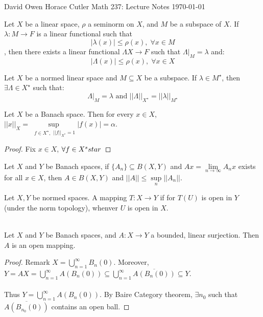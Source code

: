 \documentclass[12pt]{article}
\newenvironment{theorem}[2][Theorem]{\begin{trivlist}
\item[\hskip \labelsep {\bfseries #1}\hskip \labelsep {\bfseries #2.}]}{\end{trivlist}}
\newenvironment{definition}[2][Definition]{\begin{trivlist}
\item[\hskip \labelsep {\bfseries #1}\hskip \labelsep {\bfseries #2.}]}{\end{trivlist}}
\begin{document}
\noindent David Owen Horace Cutler \hfill {\Large Math 237: Lecture Notes} \hfill \today

\begin{theorem}{(Hahn-Banach)}
    Let $X$ be a linear space, $\rho$ a seminorm on $X$, and $M$ be a subspace of $X$. If $\lambda : M \rightarrow F$ is a linear functional such that $$|\lambda(x)| \leq \rho(x), \; \forall x \in M$$
    , then there exists a linear functional $\Lambda X \rightarrow F$ such that $\Lambda \vert_M = \lambda$ and:
    $$|\Lambda(x)| \leq \rho(x), \; \forall x \in X$$
\end{theorem}

\begin{theorem}{(Hahn-Banach Corollary 1)}
    Let $X$ be a normed linear space and $M \subseteq X$ be a subspace. If $\lambda \in M^\star$, then $\exists \Lambda \in X^\star$ such that:
    $$\Lambda \vert_M = \lambda \text{ and } ||\Lambda||_{X^\star} = ||\lambda||_{M^\star}$$
\end{theorem}

\begin{theorem}{(Hahn-Banach Corollary 2)}
    Let $X$ be a Banach space. Then for every $x \in X$, $||x||_X = \underset{\substack{f \in X^\star, }{||f||_{X^\star}} = 1}{\sup} |f(x)| = \alpha$.
    \begin{proof}
        Fix $x \in X$, $\forall f \in X^s\\star$
    \end{proof}
\end{theorem}

\begin{theorem}{(Banach-Steinhaus)}
    Let $X$ and $Y$ be Banach spaces, if $\{A_n\} \subseteq B(X,Y)$ and $Ax = \underset{n \rightarrow \infty}{\lim} A_n x$ exists for all $x \in X$, then $A \in B(X,Y)$ and $||A|| \leq \underset{n}{\sup} ||A_n||$. 
\end{theorem}

\begin{theorem}{(The Open Mapping Theorem)}
    \begin{definition}{(Open Mapping)}
        Let $X, Y$ be normed spaces. A mapping $T : X \rightarrow Y$ if for $T(U)$ is open in $Y$ (under the norm topology), whenver $U$ is open in $X$.
    \end{definition}
    \;
    \\ 
    Let $X$ and $Y$ be Banach spaces, and $A : X \rightarrow Y$ a bounded, linear surjection. Then $A$ is an open mapping.
    \begin{proof}
        Remark $X = \bigcup_{n = 1}^\infty B_n(0)$. Moreover, $Y = AX = \bigcup_{n = 1}^\infty A(B_n(0)) \subseteq \bigcup_{n = 1}^\infty \overline{A(B_n(0))} \subseteq Y$. \\ \\
        Thus $Y = \bigcup_{n = 1}^\infty A(B_n(0))$. By Baire Category theorem, $\exists n_0$ such that $\overline{A(B_{n_0}(0))}$ contains an open ball.
    \end{proof}
\end{theorem}
\end{document}
